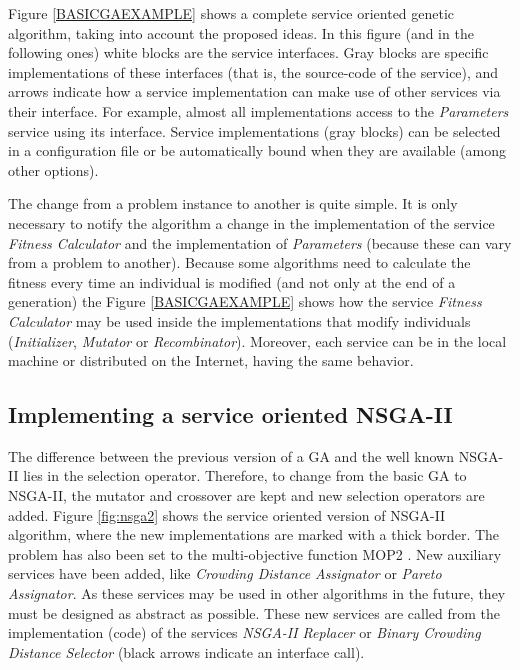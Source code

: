 Figure \ref{BASICGAEXAMPLE} shows a complete service oriented genetic algorithm, taking into account the proposed ideas. In this figure (and in the following ones) white blocks are the service interfaces. Gray blocks are specific implementations of these interfaces (that is, the source-code of the service), and  arrows indicate how a service implementation can make use of other services via their interface. For example, almost all implementations access to the {\em Parameters} service using its interface. Service implementations (gray blocks) can be selected in a configuration file or be automatically bound when they are available (among other options).

 The change from a problem instance to another is quite simple. It is only necessary to notify the algorithm a change in the implementation of the service {\em Fitness Calculator} and the implementation of {\em Parameters} (because these can vary from a problem to another). Because some algorithms need to calculate the fitness every time an individual is modified (and not only at the end of a generation) the Figure \ref{BASICGAEXAMPLE} shows how the service {\em Fitness Calculator} may be used inside the implementations that modify individuals ({\em Initializer}, {\em Mutator} or {\em Recombinator}). Moreover, each service can be in the local machine or distributed on the Internet, having the same behavior.

\subsection{Implementing a service oriented NSGA-II}
\label{sec:nsga2}

The difference between the previous version of a GA and the well known NSGA-II \citep{NSGA2} lies in the selection operator. Therefore, to change from the basic GA to NSGA-II, the mutator and crossover are kept and new selection operators are added. Figure \ref{fig:nsga2} shows the service oriented version of NSGA-II algorithm, where the new implementations are marked with a thick border. The problem has also been set to the multi-objective function MOP2 \citep{MULTIOBJ}. New auxiliary services have been added, like {\em Crowding Distance Assignator} or {\em Pareto Assignator}. As these services may be used in other algorithms in the future, they must be designed as abstract as possible. These new services are called from the implementation (code) of the services {\em NSGA-II Replacer} or {\em Binary Crowding Distance Selector} (black arrows indicate an interface call). 




